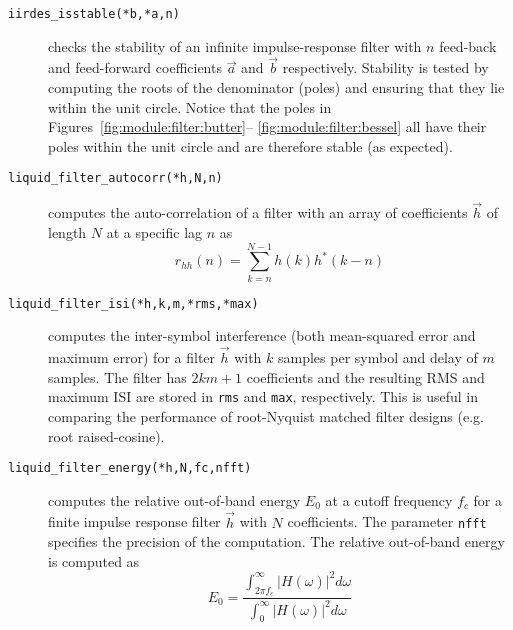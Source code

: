 \begin{description}
\item[{\tt iirdes\_isstable(*b,*a,n)}]
    checks the stability of an infinite impulse-response filter with $n$
    feed-back and feed-forward coefficients $\vec{a}$ and $\vec{b}$
    respectively.
    Stability is tested by computing the roots of the denominator
    (poles) and ensuring that they lie within the unit circle.
    Notice that the poles in
    Figures~\ref{fig:module:filter:butter}--%
           \ref{fig:module:filter:bessel}
    all have their poles within the unit circle and are therefore stable
    (as expected).

\item[{\tt liquid\_filter\_autocorr(*h,N,n)}]
    computes the auto-correlation of a filter with an array of
    coefficients $\vec{h}$ of length $N$ at a specific lag $n$ as
    \begin{equation}
    \label{eqn:filter:firdes:misc:autocorr}
        r_{hh}(n) = \sum_{k=n}^{N-1} {h(k)h^*(k-n)}
    \end{equation}

\item[{\tt liquid\_filter\_isi(*h,k,m,*rms,*max)}]
    computes the inter-symbol interference 
    (both mean-squared error and maximum error)
    for a filter $\vec{h}$ with $k$ samples per symbol and delay of $m$
    samples.
    The filter has $2km+1$ coefficients and the resulting
    RMS and maximum ISI are stored in {\tt rms} and {\tt max},
    respectively.
    This is useful in comparing the performance of root-Nyquist matched
    filter designs (e.g. root raised-cosine).

\item[{\tt liquid\_filter\_energy(*h,N,fc,nfft)}]
    computes the relative out-of-band energy $E_0$ at a cutoff frequency
    $f_c$ for a finite impulse response filter $\vec{h}$ with $N$
    coefficients.
    The parameter {\tt nfft} specifies the precision of the computation.
    The relative out-of-band energy is computed as
    \begin{equation}
    \label{eqn:filter:firdes:misc:filter_energy}
        E_0 =
            \frac{
                \int_{2 \pi f_c}^{\infty}{|H(\omega)|^2d\omega}
            } {
                \int_{0}^{\infty}{|H(\omega)|^2d\omega}
            }
    \end{equation}

\end{description}


